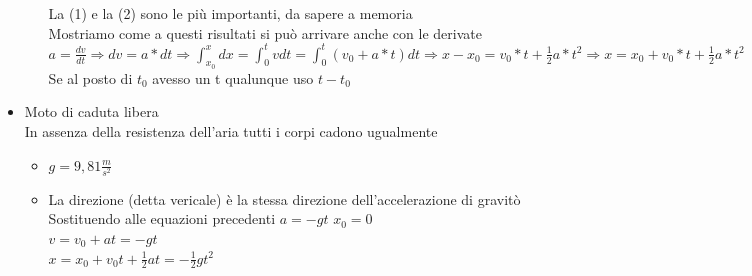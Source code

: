 \documentclass{report}
\begin{document}
\begin{itemize}
\begin{itemize}
\begin{itemize}
                \end{itemize}
                La (1) e la (2) sono le più importanti, da sapere a memoria\\
                Mostriamo come a questi risultati si può arrivare anche con le derivate\\
                $a=\frac{dv}{dt}\Rightarrow dv=a*dt\Rightarrow \int_{x_0}^{x}dx=\int_{0}^{t}vdt=\int_{0}^{t}(v_0+a*t)dt \Rightarrow x-x_0=v_0*t+\frac{1}{2}a*t^2 \Rightarrow x=x_0+v_0*t+\frac{1}{2}a*t^2$\\
                Se al posto di $t_0$ avesso un t qualunque uso $t-t_0$\\
        \end{itemize}
  \item Moto di caduta libera\\In assenza della resistenza dell'aria tutti i corpi cadono ugualmente
        \begin{itemize}


          \item $g=9,81\frac{m}{s^2}$
          \item La direzione (detta vericale) è la stessa direzione dell'accelerazione di gravitò\\Sostituendo alle equazioni precedenti $a=-gt$ $x_0=0$ \\$v=v_0+at=-gt$\\$x=x_0+v_0t+\frac{1}{2}at=-\frac{1}{2}gt^2$
        \end{itemize}
\end{itemize}
\end{document}
